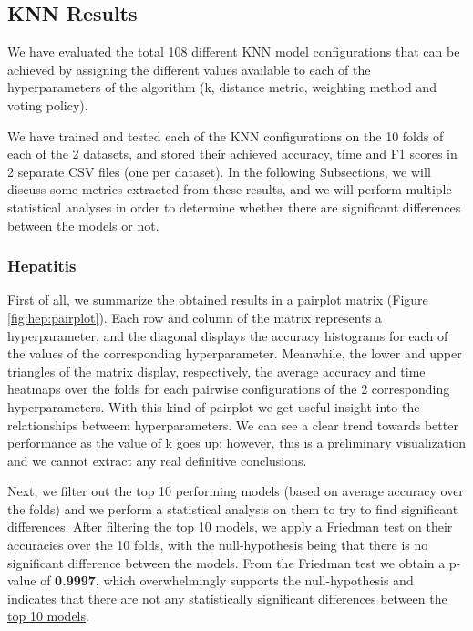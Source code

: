 \subsection{KNN Results}\label{sec:res:knn}
We have evaluated the total 108 different KNN model configurations that can be achieved by assigning the different values available to each of the hyperparameters of the algorithm (k, distance metric, weighting method and voting policy).

We have trained and tested each of the KNN configurations on the 10 folds of each of the 2 datasets, and stored their achieved accuracy, time and F1 scores in 2 separate CSV files (one per dataset). In the following Subsections, we will discuss some metrics extracted from these results, and we will perform multiple statistical analyses in order to determine whether there are significant differences between the models or not.

\subsubsection{Hepatitis}
First of all, we summarize the obtained results in a pairplot matrix (Figure \ref{fig:hep:pairplot}). Each row and column of the matrix represents a hyperparameter, and the diagonal displays the accuracy histograms for each of the values of the corresponding hyperparameter. Meanwhile, the lower and upper triangles of the matrix display, respectively, the average accuracy and time heatmaps over the folds for each pairwise configurations of the 2 corresponding hyperparameters. With this kind of pairplot we get useful insight into the relationships betweem hyperparameters. We can see a clear trend towards better performance as the value of k goes up; however, this is a preliminary visualization and we cannot extract any real definitive conclusions.

Next, we filter out the top 10 performing models (based on average accuracy over the folds) and we perform a statistical analysis on them to try to find significant differences. After filtering the top 10 models, we apply a Friedman test on their accuracies over the 10 folds, with the null-hypothesis being that there is no significant difference between the models. From the Friedman test we obtain a p-value of \textbf{0.9997}, which overwhelmingly supports the null-hypothesis and indicates that \uline{there are not any statistically significant differences between the top 10 models}.

